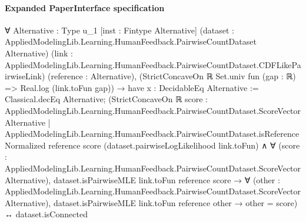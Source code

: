 \documentclass[10pt]{article}
\begin{document}
\paragraph{Expanded PaperInterface specification}
\begin{ReviewVerbatim}
∀ {Alternative : Type u_1} [inst : Fintype Alternative]
  (dataset : AppliedModelingLib.Learning.HumanFeedback.PairwiseCountDataset Alternative)
  (link : AppliedModelingLib.Learning.HumanFeedback.PairwiseCountDataset.CDFLikePairwiseLink) (reference : Alternative),
  (StrictConcaveOn ℝ Set.univ fun (gap : ℝ) => Real.log (link.toFun gap)) →
    have x : DecidableEq Alternative := Classical.decEq Alternative;
    (StrictConcaveOn ℝ
          {score : AppliedModelingLib.Learning.HumanFeedback.PairwiseCountDataset.ScoreVector Alternative |
            AppliedModelingLib.Learning.HumanFeedback.PairwiseCountDataset.isReferenceNormalized reference score}
          (dataset.pairwiseLogLikelihood link.toFun) ∧
        ∀ (score : AppliedModelingLib.Learning.HumanFeedback.PairwiseCountDataset.ScoreVector Alternative),
          dataset.isPairwiseMLE link.toFun reference score →
            ∀ (other : AppliedModelingLib.Learning.HumanFeedback.PairwiseCountDataset.ScoreVector Alternative),
              dataset.isPairwiseMLE link.toFun reference other → other = score) ↔
      dataset.isConnected
\end{ReviewVerbatim}
\end{document}
